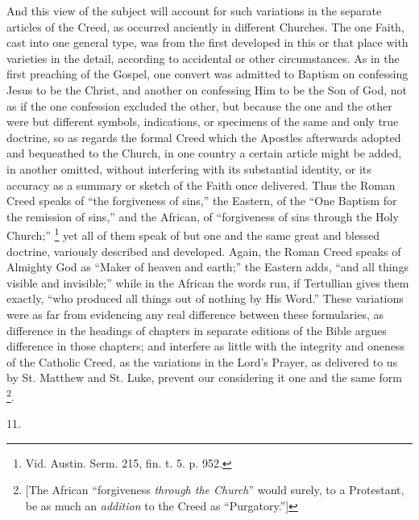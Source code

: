 And this view of the subject will account for such variations in
the separate articles of the Creed, as occurred anciently in different
Churches. The one Faith, cast into one general type, was from the
first developed in this or that place with varieties in the detail,
according to accidental or other circumstances. As in the first
preaching of the Gospel, one convert was admitted to Baptism on
confessing Jesus to be the Christ, and another on confessing Him to be
the Son of God, not as if the one confession excluded the other, but
because the one and the other were but different symbols, indications,
or specimens of the same and only true doctrine, so as regards the
formal Creed which the Apostles afterwards adopted and bequeathed to
the Church, in one country a certain article might be added, in
another omitted, without interfering with its substantial identity, or
its accuracy as a summary or sketch of the Faith once delivered. Thus
the Roman Creed speaks of ``the forgiveness of sins,'' the
Eastern, of the ``One Baptism for the remission of sins,'' and
the African, of ``forgiveness of sins through the Holy
Church;'' \footnote{Vid. Austin. Serm. 215, fin. t. 5. p. 952.} yet all of
them speak of but one and the same great and blessed doctrine,
variously described and developed. Again, the Roman Creed speaks of
Almighty God as ``Maker of heaven and earth;'' the Eastern
adds, ``and all things visible and invisible;'' while in
the African the words run, if Tertullian gives them exactly, ``who
produced all things out of nothing by His Word.'' These variations
were as far from evidencing any real difference between these
formularies, as difference in the headings of chapters in separate
editions of the Bible argues difference in those chapters; and
interfere as little with the integrity and oneness of the Catholic
Creed, as the variations in the Lord's Prayer, as delivered to us by
St. Matthew and St. Luke, prevent our considering it one and the same
form \footnote{[The African ``forgiveness \emph{through
the Church}'' would surely, to a Protestant, be as much an \emph{addition}
to the Creed as ``Purgatory.'']}.

11.

